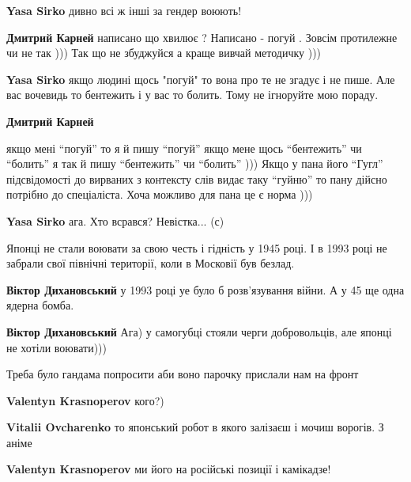 \begin{itemize}
\begin{itemize}
\textbf{Yasa Sirko} дивно всі ж інші за гендер воюють!

\textbf{Дмитрий Карней} написано що хвилює ? Написано - погуй . Зовсім протилежне
чи не так ))) Так що не збуджуйся а краще вивчай методичку )))

\textbf{Yasa Sirko} якщо людині щось "погуй" то вона про те не згадує і не пише. Але вас вочевидь то бентежить і у вас то болить. Тому не ігноруйте мою пораду.

\textbf{Дмитрий Карней} 

якщо мені \enquote{погуй} то я й пишу \enquote{погуй} якщо мене щось \enquote{бентежить} чи
\enquote{болить} я так й пишу \enquote{бентежить} чи \enquote{болить} ))) Якщо у пана його \enquote{Гугл}
підсвідомості до вирваних з контексту слів видає таку \enquote{гуйню} то пану дійсно
потрібно до спеціаліста. Хоча можливо для пана це є норма )))

\textbf{Yasa Sirko} ага. Хто всрався? Невістка... (с)
\end{itemize} %


Японці не стали воювати за свою честь і гідність у 1945 році. І в 1993 році не
забрали свої північні території, коли в Московії був безлад.

\begin{itemize} %
\textbf{Віктор Дихановський} у 1993 році уе було б розв’язування війни. А у 45 ще одна ядерна бомба.

\textbf{Віктор Дихановський} Ага) у самогубці стояли черги добровольців, але японці не хотіли воювати)))
\end{itemize} %

Треба було гандама попросити аби воно парочку прислали нам на фронт

\begin{itemize} %
\textbf{Valentyn Krasnoperov} кого?)

\textbf{Vitalii Ovcharenko} то японський робот в якого залізаєш і мочиш ворогів. З аніме

\textbf{Valentyn Krasnoperov} ми його на російські позиції і камікадзе!
\end{itemize} %



\end{itemize}
